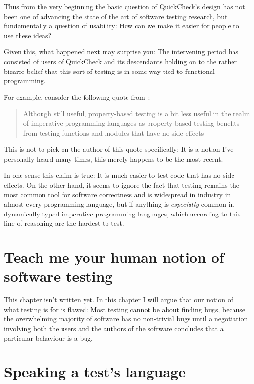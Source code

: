 Thus from the very beginning the basic question of QuickCheck's design has not been one of advancing the state of the art of software testing research,
but fundamentally a question of usability:
How can we make it easier for people to use these ideas?

Given this,
what happened next may surprise you:
The intervening period has consisted of users of QuickCheck and its descendants holding on to the rather bizarre belief that this sort of testing is in some way tied to functional programming.

For example,
consider the following quote from~\cite{matela2017tools}:

\begin{quote}
Although still useful,
property-based testing is a bit less useful in the realm of imperative programming languages as property-based testing
benefits from testing functions and modules that have no side-effects
\end{quote}

This is not to pick on the author of this quote specifically:
It is a notion I've personally heard many times,
this merely happens to be the most recent.

In one sense this claim is true:
It is much easier to test code that has no side-effects.
On the other hand,
it seems to ignore the fact that testing remains the most common tool for software correctness and is widespread in industry in almost every programming language,
but if anything is \emph{especially} common in dynamically typed imperative programming languages,
which according to this line of reasoning are the hardest to test.

\chapter{Teach me your human notion of software testing}\label{chap:purposesoftesting}

This chapter isn't written yet.
In this chapter I will argue that our notion of what testing is for is flawed:
Most testing cannot be about finding bugs,
because the overwhelming majority of software has no non-trivial bugs until a negotiation involving both the users and the authors of the software concludes that a particular behaviour is a bug.

\chapter{Speaking a test's language}\label{chap:testinglanguage}


